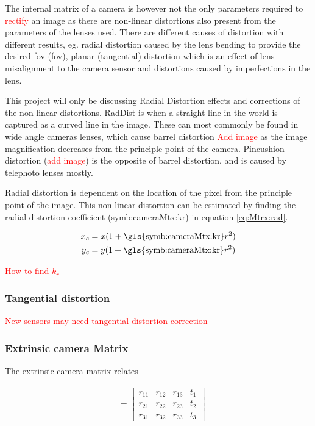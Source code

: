 \documentclass{article}
\newcommand{\rf}[1]{\textcolor{red}{#1}}
\newcommand{\sie}[1]{\text{\gls{symb:cameraMtx:#1}}}   %
\newcommand{\sba}[1]{\gls{symb:cameraMtx:#1}}          %
\begin{document}
The internal matrix of a camera is however not the only parameters required to \rf{rectify} an image as there are non-linear distortions also present from the parameters of the lenses used.  There are different causes of distortion with different results, eg. radial distortion caused by the lens bending to provide the desired \acrlong{fov} (\acrshort{fov}), planar (tangential) distortion which is an effect of lens misalignment to the camera sensor and distortions caused by imperfections in the lens.

This project will only be discussing Radial Distortion effects and corrections of the non-linear distortions.  \Gls{RadDist} is when a straight line in the world is captured as a curved line in the image.  These can most commonly be found in wide angle cameras lenses, which cause barrel distortion \rf{Add image} as the image magnification decreases from the principle point of the camera.  Pincushion distortion (\rf{add image}) is the opposite of barrel distortion, and is caused by telephoto lenses mostly.

Radial distortion is dependent on the location of the pixel from the principle point of the image.  This non-linear distortion can be estimated by finding the radial distortion coefficient (\sba{kr}) in equation \ref{eq:Mtrx:rad}.

\begin{align}
    \begin{split}
        x_c &= x(1+\sie{kr}r^2)\\
        y_c &= y(1+\sie{kr}r^2) \label{eq:Mtrx:rad}
    \end{split}
\end{align}

\rf{How to find $k_r$}

\subsubsection{Tangential distortion}

\rf{New sensors may need tangential distortion correction}


\subsubsection{Extrinsic camera Matrix}

The extrinsic camera matrix relates 

\begin{align}
[\sie{R} \mid \sie{bt}] &=\left[\begin{array}{ccc|c}
r_{11} & r_{12} & r_{13} & t_{1} \\
r_{21} & r_{22} & r_{23} & t_{2} \\
r_{31} & r_{32} & r_{33} & t_{3}
\end{array}\right] \label{eq:Mtrx:Ext}
\end{align}
\end{document}
